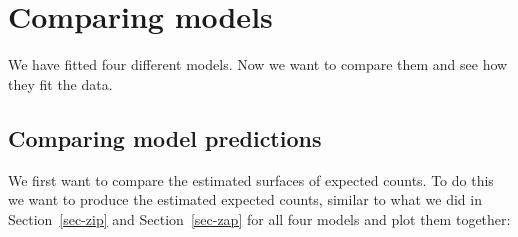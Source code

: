 \documentclass[
  letterpaper,
  DIV=11,
  numbers=noendperiod]{scrartcl}
\begin{document}
\section{Comparing models}\label{comparing-models}

We have fitted four different models. Now we want to compare them and
see how they fit the data.

\subsection{Comparing model
predictions}\label{comparing-model-predictions}

We first want to compare the estimated surfaces of expected counts. To
do this we want to produce the estimated expected counts, similar to
what we did in Section~\ref{sec-zip} and Section~\ref{sec-zap} for all
four models and plot them together:
\end{document}
